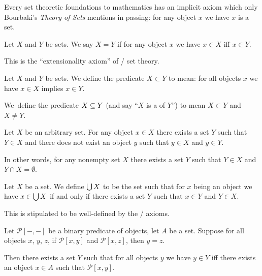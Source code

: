 \begin{remark}
Every set theoretic foundations to mathematics has an implicit axiom
which only Bourbaki's \emph{Theory of Sets} mentions in passing: for
any object $x$ we have $x$ is a set.
\end{remark}

\begin{axiom}\label{defn:set-theory:extensionality}
Let $X$ and $Y$ be sets. We say $X = Y$ if for any object $x$ we have
$x\in X$ iff $x\in Y$.

This is the ``extensionality axiom'' of \ZF/ set theory.
\end{axiom}

\begin{definition}
Let $X$ and $Y$ be sets. We define the predicate $X\subset Y$ to mean:
for all objects $x$ we have $x\in X$ implies $x\in Y$.

We\ define the predicate $X\propersubset Y$ (and say ``$X$ is a
 of $Y$'') to mean $X\subset Y$ and $X\neq Y$.
\end{definition}

\begin{axiom}[Regularity]
Let $X$ be an arbitrary set. For any object $x\in X$ there exists a
set $Y$ such that $Y\in X$ and there does not exist an object $y$ such
that $y\in X$ and $y\in Y$.

In other words, for any nonempty set $X$ there exists a set $Y$ such
that $Y\in X$ and $Y\cap X=\emptyset$.
\end{axiom}

\begin{axiom}
Let $X$ be a set. We define $\bigcup X$ to be the set such that for $x$
being an object we have $x\in\bigcup X$ if and only if there exists a
set $Y$ such that $x\in Y$ and $Y\in X$.

This is stipulated to be well-defined by the \ZF/ axioms.
\end{axiom}

\begin{axiom-scheme}[Replacement]
Let $\mathcal{P}[-,-]$ be a binary predicate of objects, let $A$ be a set.
Suppose for all objects $x$, $y$, $z$, if $\mathcal{P}[x,y]$ and
$\mathcal{P}[x,z]$, then $y = z$.

Then there exists a set $Y$ such that for all objects $y$ we have
$y\in Y$ iff there exists an object $x\in A$ such that $\mathcal{P}[x,y]$.
\end{axiom-scheme}

